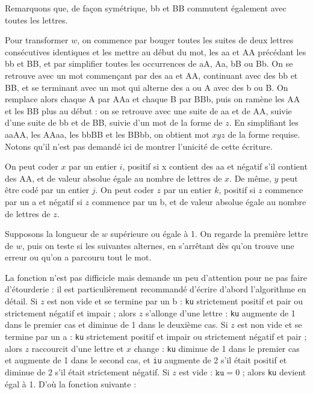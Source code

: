 Remarquons que, de façon symétrique, bb et BB commutent également avec toutes les lettres.

\Q
Pour transformer $w$, on commence par bouger toutes les suites de deux lettres consécutives identiques et les mettre au début du mot, les aa et AA précédant les bb et BB, et par simplifier toutes les occurrences de aA, Aa, bB ou Bb. On se retrouve avec un mot commençant par des aa et AA, continuant avec des bb et BB, et se terminant avec un mot qui alterne des a ou A avec des b ou B. On remplace alors chaque A par AAa et chaque B par BBb, puis on ramène les AA et les BB plus au début : on se retrouve avec une suite de aa et de AA, suivie d'une suite de bb et de BB, suivie d'un mot de la forme de $z$. En simplifiant les aaAA, les AAaa, les bbBB et les BBbb, on obtient mot $xyz$ de la forme requise. Notons qu'il n'est pas demandé ici de montrer l'unicité de cette écriture.

\Q
On peut coder $x$ par un entier $i$, positif si x contient des aa et négatif s'il contient des AA, et de valeur absolue égale au nombre de lettres de $x$. De même, $y$ peut être codé par un entier $j$. On peut coder $z$ par un entier $k$, positif si $z$ commence par un a et négatif si $z$ commence par un b, et de valeur absolue égale au nombre de lettres de $z$.

\Q
Supposons la longueur de $w$ supérieure ou égale à 1. On regarde la première lettre de $w$, puis on teste si les suivantes alternes, en s'arrêtant dès qu'on trouve une erreur ou qu'on a parcouru tout le mot.


\newpage

\Q
La fonction n'est pas difficicle mais demande un peu d'attention pour ne pas faire d'étourderie : il est particulièrement recommandé d'écrire d'abord l'algorithme en détail. Si $z$ est non vide et se termine par un b : \texttt{ku} strictement positif et pair ou strictement négatif et impair ; alors $z$ s'allonge d'une lettre : \texttt{ku} augmente de 1 dans le premier cas et diminue de 1 dans le deuxième cas. Si $z$ est non vide et se termine par un a : \texttt{ku} strictement positif et impair ou strictement négatif et pair ; alors $z$ raccourcit d'une lettre et $x$ change : \texttt{ku} diminue de 1 dans le premier cas et augmente de 1 dans le second cas, et \texttt{iu} augmente de 2 s'il était positif et diminue de 2 s'il était strictement négatif. Si $z$ est vide : $\texttt{ku}=0$ ; alors \texttt{ku} devient égal à 1. D'où la fonction suivante :

